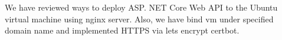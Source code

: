 We have reviewed ways to deploy ASP. NET Core Web API to the Ubuntu virtual machine using nginx server.
Also, we have bind vm under specified domain name and implemented HTTPS via lets encrypt certbot.